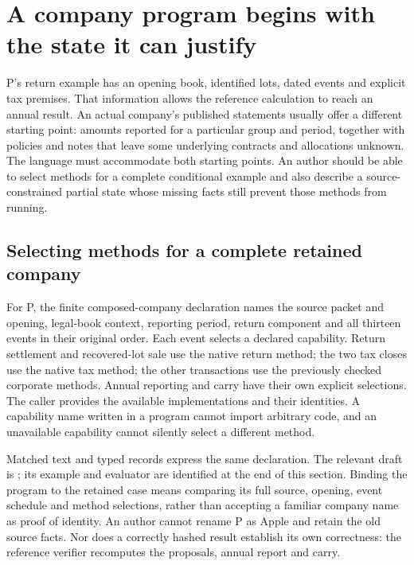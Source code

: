 \section{A company program begins with the state it can justify}
\label{sec:company-source-state}

P's return example has an opening book, identified lots, dated events and
explicit tax premises. That information allows the reference calculation to
reach an annual result. An actual company's published statements usually
offer a different starting point: amounts reported for a particular group
and period, together with policies and notes that leave some underlying
contracts and allocations unknown. The language must accommodate both
starting points. An author should be able to select methods for a complete
conditional example and also describe a source-constrained partial state
whose missing facts still prevent those methods from running.

\subsection{Selecting methods for a complete retained company}

For P, the finite composed-company declaration names the source packet and
opening, legal-book context, reporting period, return component and all
thirteen events in their original order. Each event selects a declared
capability. Return settlement and recovered-lot sale use the native return
method; the two tax closes use the native tax method; the other transactions
use the previously checked corporate methods. Annual reporting and carry
have their own explicit selections. The caller provides the available
implementations and their identities. A capability name written in a
program cannot import arbitrary code, and an unavailable capability cannot
silently select a different method.

Matched text and typed records express the same declaration. The relevant
draft is ; its example and evaluator
are identified at the end of this section. Binding the program to the
retained case means comparing its full source, opening, event schedule and
method selections, rather than accepting a familiar company name as proof
of identity. An author cannot rename P as Apple and retain the old source
facts. Nor does a correctly hashed result establish its own correctness:
the reference verifier recomputes the proposals, annual report and carry.

